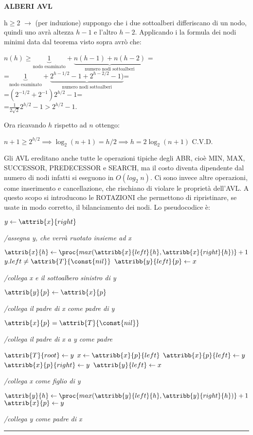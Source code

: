 \documentclass[8pt]{extarticle}
\newenvironment{formulario}
{
\setlength{\columnsep}{3em}
\twocolumn
\lstset{tabsize=3}
\begin{spacing}{1}
\begin{flushleft}
}{
\end{flushleft}
\end{spacing}
}
\newenvironment{tcenter}{
  \par
  \centering
  \setlength{\parskip}{0pt} %
  \noindent
}{
  \par
}
\newenvironment{Descr}
{
	\begin{description}[topsep=0pt,itemsep=0pt,partopsep=0pt, parsep=0pt]
}{
	\end{description}
}
\newenvironment{code}[1]
{
\begin{codebox}
\Procname{$#1$}
}{
\end{codebox}
}
\newenvironment{myParagraph}[1]
{
\begin{tcenter}
\textbf{#1}
\end{tcenter}
}{
\myRule
}
\newcommand{\myRule}{\rule{250pt}{0.1pt}}
\newcommand{\la}{\leftarrow}
\newcommand{\ra}{\rightarrow}
\newcommand{\IF}[1]{\If $#1$ \Then}
\newcommand{\ELSEIF}[1]{\ElseIf $#1$\Then}
\newcommand{\ELSE}{\Else}
\newcommand{\COMMENT}[1]{\begin{minipage}{0.5\textwidth}\color{gray}\qquad\footnotesize\textit{/#1}\end{minipage}}
\newcommand{\END}{\End}
\newcommand{\get}{\la}
\begin{document}
\begin{formulario}
\begin{myParagraph}{ALBERI AVL}
\begin{Descr}
\begin{Descr}
\begin{Descr}
					\item[h$\bm{\geq}$2] $\ra$ (per induzione) suppongo che i due sottoalberi differiscano di un nodo, quindi uno avrà altezza $h-1$ e l'altro $h-2$. Applicando i la formula dei nodi minimi data dal teorema visto sopra avrò che:
					\begin{tcenter}
					$n(h)\geq \underbrace{1}_\text{nodo esaminato} + \underbrace{n(h-1)+n(h-2)}_\text{numero nodi sottoalberi}$ =\\
					=$\underbrace{1}_\text{nodo esaminato} + \underbrace{2^{h-1/2}-1+2^{h-2/2}-1)}_\text{numero nodi sottoalberi}$=\\
					=$(2^{-1/2}+2^{-1})2^{h/2}-1$=\\=$\frac{1}{2\sqrt{2}}2^{h/2}-1>2^{h/2}-1$.
					\end{tcenter}
					Ora ricavando $h$ rispetto ad $n$ ottengo: 
					\begin{tcenter}
						$n+1\geq2^{h/2}\implies\log_2(n+1)=h/2\implies h=2\log_2(n+1)$ \qquad C.V.D.
					\end{tcenter}
				\end{Descr}
			\end{Descr}
		\end{Descr} 
Gli AVL ereditano anche tutte le operazioni tipiche degli ABR, cioè MIN, MAX, SUCCESSOR, PREDECESSOR e SEARCH, ma il costo diventa dipendente dal numero di nodi infatti si eseguono in $O(log_2 \;n)$. Ci sono invece altre operazioni, come inserimento e cancellazione, che rischiano di violare le proprietà dell'AVL. A questo scopo si introducono le ROTAZIONI che permettono di ripristinare, se usate in modo corretto, il bilanciamento dei nodi. Lo pseudocodice è:
		\begin{code}{LeftRotate(T,x)}
\li $y \get \attrib{x}{right}$ \COMMENT{assegna y, che verrà ruotato insieme ad x}
\li $\attrib{x}{h}\get \proc{max(\attribb{x}{left}{h},\attribb{x}{right}{h})}+1$
\li \IF{y.left \neq \attrib{T}{\const{nil}}}
	\li $\attribb{y}{left}{p}\get x$ \COMMENT{collega x e il sottoalbero sinistro di y}
\END
\li $\attrib{y}{p}\get\attrib{x}{p}$ \COMMENT{collega il padre di x come padre di y}
\li \IF{\attrib{x}{p}=\attrib{T}{\const{nil}}} \qquad\qquad \COMMENT{collega il padre di x a y come padre}
	\li $\attrib{T}{root}\get y$
\li \ELSEIF{x\gets\attribb{x}{p}{left}} 
	\li $\attribb{x}{p}{left}\get y$
\li \ELSE
	\li $\attribb{x}{p}{right}\get y$
\END
\li $\attrib{y}{left}\get x$ \COMMENT{collega x come figlio di y}
\li $\attrib{y}{h}\get\proc{max(\attribb{y}{left}{h},\attribb{y}{right}{h})}+1$
\li $\attrib{x}{p}\get y$ \COMMENT{collega y come padre di x}

\end{code}
\end{myParagraph}
\end{formulario}
\end{document}
